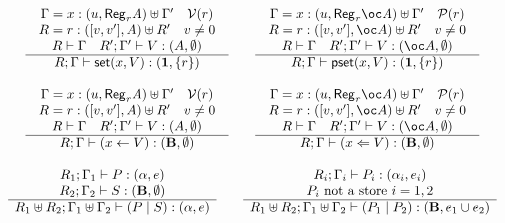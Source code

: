 \documentclass[11pt]{article}
\newcommand{\Gives}{\vdash}             \newcommand{\IGives}{\vdash_{I}}        \newcommand{\AIGives}{\vdash_{{\it AI}}} \newcommand{\CGives}{\vdash_{C}}
\newcommand{\hyp}[3]{#1:(#2, #3)}
\newcommand{\behtype}{{\bf B}}
\newcommand{\csum}{\uplus}              \newcommand{\dpar}{\mid\!\mid}
\newcommand{\infer}[2]{\begin{array}{c} #1 \\ \hline #2 \end{array}}
\newcommand{\set}[1]{\{#1\}}
\newcommand{\pst}[2]{{\sf pset}(#1,#2)}
\newcommand{\st}[2]{{\sf set}(#1,#2)}
\newcommand{\rgtype}[2]{{\it {\sf Reg}_{#1} #2}}
\newcommand{\store}[2]{(#1 \leftarrow #2)}
\newcommand{\pstore}[2]{(#1 \Leftarrow #2)}
\newcommand{\upair}[2]{[#1,#2]}
\newcommand{\vlt}[1]{{\cal V}(#1)}
\newcommand{\prs}[1]{{\cal P}(#1)}
\begin{document}
\begin{table}
{\[\begin{array}{c}
\infer{\begin{array}{c}
\Gamma= \hyp{x}{u}{\rgtype{r}{A}} \csum \Gamma'\quad \vlt{r} \\
R = \hyp{r}{\upair{v}{v'}}{A} \csum R' \quad v \neq 0 \\
R\Gives \Gamma\quad R';\Gamma'\Gives V:(A,\emptyset)
\end{array}}
{R;\Gamma \Gives \st{x}{V}:(\tertype,\set{r})} 

\qquad

\infer{\begin{array}{c}
\Gamma= \hyp{x}{u}{\rgtype{r}{\bang A}} \csum \Gamma' \quad \prs{r}\\
R = \hyp{r}{\upair{v}{v'}}{\bang A} \csum R' \quad v \neq 0 \\
R\Gives \Gamma\quad R';\Gamma'\Gives V:(\bang A,\emptyset)
\end{array}}
{R;\Gamma \Gives \pst{x}{V}:(\tertype,\set{r})} \\ \\ 


\infer{\begin{array}{c}
\Gamma= \hyp{x}{u}{\rgtype{r}{A}} \csum \Gamma' \quad \vlt{r}\\
R = \hyp{r}{\upair{v}{v'}}{A} \csum R' \quad v \neq 0 \\
R\Gives \Gamma\quad R';\Gamma'\Gives V:(A,\emptyset)
\end{array}}
{R;\Gamma \Gives \store{x}{V}:(\behtype,\emptyset)} 

\qquad

\infer{\begin{array}{c}
\Gamma= \hyp{x}{u}{\rgtype{r}{\bang A}} \csum \Gamma' \quad \prs{r}\\
R = \hyp{r}{\upair{v}{v'}}{\bang A} \csum R' \quad v \neq 0 \\
R\Gives \Gamma\quad R';\Gamma'\Gives V:(\bang A,\emptyset)
\end{array}}
{R;\Gamma \Gives \pstore{x}{V}:(\behtype,\emptyset)} \\ \\ 


\infer{\begin{array}{c}
R_1;\Gamma_1\Gives P:(\alpha,e)\\
R_2;\Gamma_2\Gives S:(\behtype,\emptyset)
\end{array}}
{R_1\csum R_2; \Gamma_1\csum \Gamma_2 \Gives (P \mid S):(\alpha,e)}

\qquad

\infer{
\begin{array}{c}
R_i;\Gamma_i\Gives P_i:(\alpha_i,e_i)\\
P_i \mbox{ not a store } i=1,2
\end{array}}
{R_1\csum R_2; \Gamma_1\csum \Gamma_2 \Gives (P_1 \mid
  P_2):(\behtype,e_1\union e_2)}


\end{array}
\]}
\caption{An affine-intuitionistic type and effect system}\label{ter-system}
\end{table}
\end{document}
